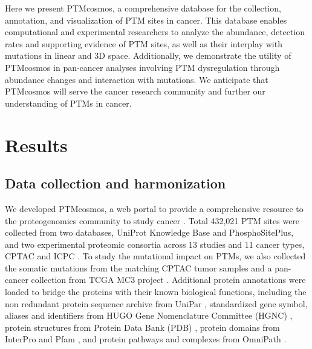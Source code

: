 Here we present PTMcosmos, a comprehensive database for the collection, annotation, and visualization of PTM sites in cancer. This database enables computational and experimental researchers to analyze the abundance, detection rates and supporting evidence of PTM sites, as well as their interplay with mutations in linear and 3D space. Additionally, we demonstrate the utility of PTMcosmos in pan-cancer analyses involving PTM dysregulation through abundance changes and interaction with mutations. We anticipate that PTMcosmos will serve the cancer research community and further our understanding of PTMs in cancer.



\section{Results}

\subsection{Data collection and harmonization}
We developed PTMcosmos, a web portal to provide a comprehensive resource to the proteogenomics community to study cancer . Total 432,021 PTM sites were collected from two databases, UniProt Knowledge Base and PhosphoSitePlus, and two experimental proteomic consortia across 13 studies and 11 cancer types, CPTAC and ICPC . To study the mutational impact on PTMs, we also collected the somatic mutations from the matching CPTAC tumor samples and a pan-cancer collection from TCGA MC3 project \cite{ellrottk_tcga:MC3MutationCalling2018}. Additional protein annotations were loaded to bridge the proteins with their known biological functions, including the non redundant protein sequence archive from UniPar \cite{leinonenr_apweilerr:UniProtArchive2004}, standardized gene symbol, aliases and identifiers from HUGO Gene Nomenclature Committee (HGNC) \cite{brufordea_tweedies:GuidelinesHuman2020}, protein structures from Protein Data Bank (PDB) \cite{bermanhm_bournepe:ProteinData2000}, protein domains from InterPro \cite{blumm_finnrd:InterProProtein2021} and Pfam \cite{mistryj_batemana:PfamProtein2021}, and protein pathways and complexes from OmniPath \cite{tureid_saez-rodriguezj:OmniPathGuidelines2016}.


